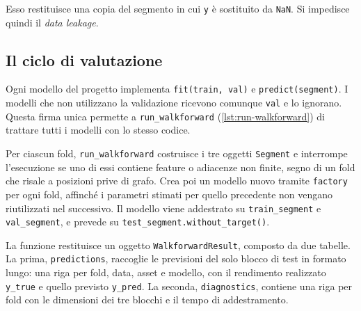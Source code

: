 Esso restituisce una copia del segmento in cui \texttt{y} è sostituito da \texttt{NaN}. Si impedisce quindi il \emph{data leakage}.

\subsection{Il ciclo di valutazione}

Ogni modello del progetto implementa \texttt{fit(train, val)} e \texttt{predict(segment)}. I modelli che non utilizzano la validazione ricevono comunque \texttt{val} e lo ignorano. Questa firma unica permette a \texttt{run\_walkforward} (\cref{lst:run-walkforward}) di trattare tutti i modelli con lo stesso codice.

Per ciascun fold, \texttt{run\_walkforward} costruisce i tre oggetti \texttt{Segment} e interrompe l'esecuzione se uno di essi contiene feature o adiacenze non finite, segno di un fold che risale a posizioni prive di grafo. Crea poi un modello nuovo tramite \texttt{factory} per ogni fold, affinché i parametri stimati per quello precedente non vengano riutilizzati nel successivo. Il modello viene addestrato su \texttt{train\_segment} e \texttt{val\_segment}, e prevede su \texttt{test\_segment.without\_target()}.

La funzione restituisce un oggetto \texttt{WalkforwardResult}, composto da due tabelle. La prima, \texttt{predictions}, raccoglie le previsioni del solo blocco di test in formato lungo: una riga per fold, data, asset e modello, con il rendimento realizzato \texttt{y\_true} e quello previsto \texttt{y\_pred}. La seconda, \texttt{diagnostics}, contiene una riga per fold con le dimensioni dei tre blocchi e il tempo di addestramento.


